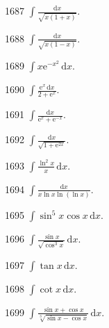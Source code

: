 \begin{prob}[S]{1687}
$\displaystyle\int \frac{\mathrm{d}x}{\sqrt{x(1 + x)}}.$
\end{prob}

\begin{prob}[S]{1688}
$\displaystyle\int \frac{\mathrm{d}x}{\sqrt{x(1 - x)}}.$
\end{prob}

\begin{prob}[S]{1689}
$\displaystyle\int x\mathrm{e}^{-x^2}\,\mathrm{d}x.$
\end{prob}

\begin{prob}[S]{1690}
$\displaystyle\int \frac{\mathrm{e}^x\,\mathrm{d}x}{2 + \mathrm{e}^x}.$
\end{prob}

\begin{prob}[S]{1691}
$\displaystyle\int \frac{\mathrm{d}x}{\mathrm{e}^x + \mathrm{e}^{-x}}.$
\end{prob}

\begin{prob}[S]{1692}
$\displaystyle\int \frac{\mathrm{d}x}{\sqrt{1 + \mathrm{e}^{2x}}}.$
\end{prob}

\begin{prob}[S]{1693}
$\displaystyle\int \frac{\ln^2 x}{x}\,\mathrm{d}x.$
\end{prob}

\begin{prob}[S]{1694}
$\displaystyle\int \frac{\mathrm{d}x}{x\ln x\ln(\ln x)}.$
\end{prob}

\begin{prob}[S]{1695}
$\displaystyle\int \sin^5 x\cos x\,\mathrm{d}x.$
\end{prob}

\begin{prob}[S]{1696}
$\displaystyle\int \frac{\sin x}{\sqrt{\cos^3 x}}\,\mathrm{d}x.$
\end{prob}

\begin{prob}[S]{1697}
$\displaystyle\int \tan x\,\mathrm{d}x.$
\end{prob}

\begin{prob}[S]{1698}
$\displaystyle\int \cot x\,\mathrm{d}x.$
\end{prob}

\begin{prob}[S]{1699}
$\displaystyle\int \frac{\sin x + \cos x}{\sqrt[3]{\sin x - \cos x}}\,\mathrm{d}x.$
\end{prob}

